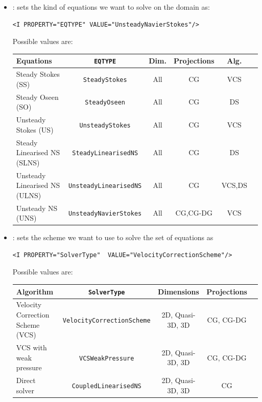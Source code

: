 \begin{itemize}
\item {}: sets the kind of equations we want to solve on the domain
as:

\begin{lstlisting}[style=XMLStyle]
<I PROPERTY="EQTYPE" VALUE="UnsteadyNavierStokes"/>
\end{lstlisting}

Possible values are:
\begin{center}
\footnotesize
\renewcommand\arraystretch{1.2}
\begin{tabular}{lccccc}
\toprule
{Equations} & {\texttt{EQTYPE}} &{Dim.}&{Projections} & Alg.\\
\midrule
Steady Stokes (SS)& \texttt{SteadyStokes} & All & CG &VCS \\
Steady Oseen (SO) & \texttt{SteadyOseen} & All & CG& DS \\
Unsteady Stokes (US) & \texttt{UnsteadyStokes} & All & CG &VCS \\
Steady Linearised NS (SLNS) & \texttt{SteadyLinearisedNS} & All & CG & DS \\
Unsteady Linearised NS (ULNS) & \texttt{UnsteadyLinearisedNS} & All & CG & VCS,DS \\
Unsteady NS (UNS) & \texttt{UnsteadyNavierStokes} & All & CG,CG-DG & VCS \\
\bottomrule
\end{tabular}
\end{center}


\item {}: sets the scheme we want to use to solve the set of
equations as
\begin{lstlisting}[style=XMLStyle]
<I PROPERTY="SolverType"  VALUE="VelocityCorrectionScheme"/>
\end{lstlisting}

Possible values are:
\begin{center}
\footnotesize
\begin{tabular}{lcccc}
\toprule
{Algorithm} & {\texttt{SolverType}} &{Dimensions}&{Projections} \\
\midrule
Velocity Correction Scheme (VCS) & \texttt{VelocityCorrectionScheme} & 2D, Quasi-3D, 3D & CG, CG-DG\\
VCS with weak pressure & \texttt{VCSWeakPressure} & 2D, Quasi-3D, 3D & CG, CG-DG\\
Direct solver & \texttt{CoupledLinearisedNS} & 2D, Quasi-3D, 3D &CG\\
\bottomrule
\end{tabular}
\end{center}


\end{itemize}
